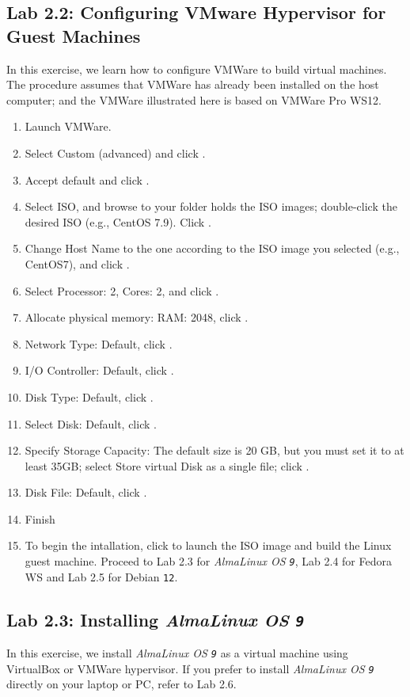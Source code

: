 \subsection*{Lab 2.2: Configuring VMware Hypervisor for Guest Machines}
In this exercise, we learn how to configure VMWare to build virtual machines. The procedure assumes that VMWare has already been installed on the host computer; and the VMWare illustrated here is based on VMWare Pro WS12. 
\begin{enumerate}
\item Launch VMWare.
\item Select Custom (advanced) and click {}.
\item Accept default and click {}.
\item Select ISO, and browse to your folder holds the ISO images; double-click the desired ISO (e.g., CentOS 7.9). Click {}.
\item Change Host Name to the one according to the ISO image you selected (e.g., CentOS7), and click {}.
\item Select Processor: 2, Cores: 2, and click {}.
\item Allocate physical memory: RAM: 2048, click {}.
\item Network Type: Default, click {}.
\item I/O Controller: Default, click {}.
\item Disk Type: Default, click {}.
\item Select Disk: Default, click {}.
\item Specify Storage Capacity: The default size is 20 GB, but you must set it to at least 35GB; select Store virtual Disk as a single file; click {}.
\item Disk File: Default, click {}.
\item Finish
\item To begin the intallation, click {} to launch the ISO image and build the Linux guest machine. Proceed to Lab 2.3 for {\it{AlmaLinux OS {\tt{9}}}}, Lab 2.4 for Fedora WS and Lab 2.5 for Debian {\tt{12}}. 
\end{enumerate}

%
%
\subsection*{Lab 2.3: Installing {\it{AlmaLinux OS {\tt{9}}}}}
In this exercise, we install {\it{AlmaLinux OS {\tt{9}}}} as a virtual machine using VirtualBox or VMWare hypervisor. If you prefer to install {\it{AlmaLinux OS {\tt{9}}}} directly on your laptop or PC, refer to Lab 2.6. 

